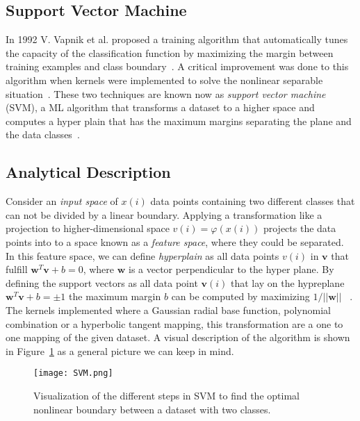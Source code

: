 \subsection{Support Vector Machine}




In 1992 V. Vapnik et al. proposed a training algorithm that automatically tunes the capacity of the classification function by maximizing the margin between training examples and class boundary~\cite{boser1992training}. A critical improvement was done to this algorithm when kernels were implemented to solve the nonlinear separable situation~\cite{smola1998learning}. These two techniques are known now as \textit{support vector machine} (SVM), a ML algorithm that transforms a dataset to a higher space and computes a hyper plain that has the maximum margins separating the plane and the data classes~\cite{marsland2014machine}.~\\

\subsection{Analytical Description}

 Consider an \textit{input space} of $x(i)$ data points containing two different classes that can not be divided by a linear boundary. Applying a transformation like a projection to higher-dimensional space $v(i)=\varphi(x(i))$ projects the data points into to a space known as a \textit{feature space}, where they could be separated. In this feature space, we can define \textit{hyperplain} as all data points $v(i)$ in $\textbf{v}$ that fulfill $\textbf{w}^{T}\textbf{v}+b=0$, where $\textbf{w}$ is a vector perpendicular to the hyper plane. By defining the support vectors  as all data point $\textbf{v}(i)$ that lay on the hypreplane  $\textbf{w}^{T}\textbf{v}+b=\pm 1$ the maximum margin $b$ can be computed by maximizing $1/||\textbf{w}||$ ~\cite{marsland2014machine,Nonparameter,khan2019optical}. The kernels implemented where a Gaussian radial base function, polynomial combination or a hyperbolic tangent mapping, this transformation are a one to one mapping of the given dataset. A visual description of the algorithm is shown in Figure~\ref{fig:SVMshow} as a general picture we can keep in mind.~\\  
\begin{figure}[h]
\centering
\texttt{[image: SVM.png]}
\caption{Visualization of the different steps in SVM to find the optimal nonlinear boundary between a dataset with two classes.}
\label{fig:SVMshow}
\end{figure}

